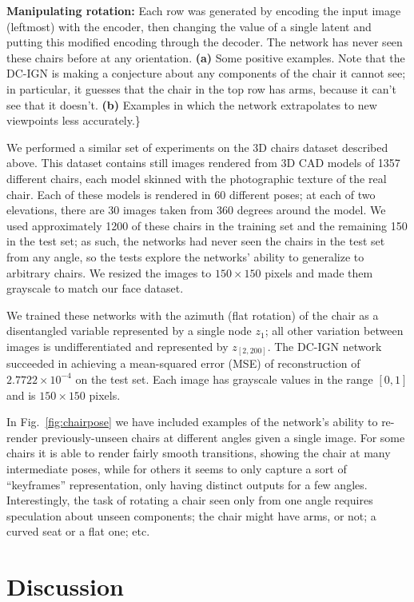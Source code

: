 \documentclass[12pt,twoside]{mitthesis}
\begin{document}
\textbf{Manipulating rotation:} Each row was generated by encoding the
input image (leftmost) with the encoder, then changing the value of a
single latent and putting this modified encoding through the decoder.
The network has never seen these chairs before at any orientation.
\textbf{(a)} Some positive examples. Note that the DC-IGN is making a
conjecture about any components of the chair it cannot see; in
particular, it guesses that the chair in the top row has arms, because
it can't see that it doesn't. \textbf{(b)} Examples in which the network
extrapolates to new viewpoints less accurately.\}

We performed a similar set of experiments on the 3D chairs dataset
described above. This dataset contains still images rendered from 3D CAD
models of 1357 different chairs, each model skinned with the
photographic texture of the real chair. Each of these models is rendered
in 60 different poses; at each of two elevations, there are 30 images
taken from 360 degrees around the model. We used approximately 1200 of
these chairs in the training set and the remaining 150 in the test set;
as such, the networks had never seen the chairs in the test set from any
angle, so the tests explore the networks' ability to generalize to
arbitrary chairs. We resized the images to \(150 \times 150\) pixels and
made them grayscale to match our face dataset.

We trained these networks with the azimuth (flat rotation) of the chair
as a disentangled variable represented by a single node \(z_1\); all
other variation between images is undifferentiated and represented by
\(z_{[2,200]}\). The DC-IGN network succeeded in achieving a
mean-squared error (MSE) of reconstruction of \(2.7722 \times 10^{-4}\)
on the test set. Each image has grayscale values in the range \([0,1]\)
and is \(150 \times 150\) pixels.

In Fig.~\ref{fig:chairpose} we have included examples of the network's
ability to re-render previously-unseen chairs at different angles given
a single image. For some chairs it is able to render fairly smooth
transitions, showing the chair at many intermediate poses, while for
others it seems to only capture a sort of ``keyframes'' representation,
only having distinct outputs for a few angles. Interestingly, the task
of rotating a chair seen only from one angle requires speculation about
unseen components; the chair might have arms, or not; a curved seat or a
flat one; etc.

\section{Discussion}\label{discussion}
\end{document}
